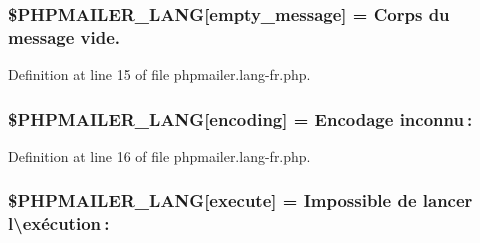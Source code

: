\subsubsection[{\texorpdfstring{\$\+P\+H\+P\+M\+A\+I\+L\+E\+R\+\_\+\+L\+A\+NG}{$PHPMAILER_LANG}}]{\setlength{\rightskip}{0pt plus 5cm}\$P\+H\+P\+M\+A\+I\+L\+E\+R\+\_\+\+L\+A\+NG\mbox{[}\textquotesingle{}empty\+\_\+message\textquotesingle{}\mbox{]} = \textquotesingle{}Corps du message vide.\textquotesingle{}}\hypertarget{phpmailer_8lang-fr_8php_a33772099f637c9d6c2cd7425e0e37fed}{}\label{phpmailer_8lang-fr_8php_a33772099f637c9d6c2cd7425e0e37fed}


Definition at line 15 of file phpmailer.\+lang-\/fr.\+php.

\subsubsection[{\texorpdfstring{\$\+P\+H\+P\+M\+A\+I\+L\+E\+R\+\_\+\+L\+A\+NG}{$PHPMAILER_LANG}}]{\setlength{\rightskip}{0pt plus 5cm}\$P\+H\+P\+M\+A\+I\+L\+E\+R\+\_\+\+L\+A\+NG\mbox{[}\textquotesingle{}encoding\textquotesingle{}\mbox{]} = \textquotesingle{}Encodage inconnu \+: \textquotesingle{}}\hypertarget{phpmailer_8lang-fr_8php_a817f7283f3d54c970a0c10305cc668cc}{}\label{phpmailer_8lang-fr_8php_a817f7283f3d54c970a0c10305cc668cc}


Definition at line 16 of file phpmailer.\+lang-\/fr.\+php.

\subsubsection[{\texorpdfstring{\$\+P\+H\+P\+M\+A\+I\+L\+E\+R\+\_\+\+L\+A\+NG}{$PHPMAILER_LANG}}]{\setlength{\rightskip}{0pt plus 5cm}\$P\+H\+P\+M\+A\+I\+L\+E\+R\+\_\+\+L\+A\+NG\mbox{[}\textquotesingle{}execute\textquotesingle{}\mbox{]} = \textquotesingle{}Impossible de lancer l\textbackslash{}\textquotesingle{}exécution \+: \textquotesingle{}}\hypertarget{phpmailer_8lang-fr_8php_a668217a9563a168f30f2a8548b6ed5a9}{}\label{phpmailer_8lang-fr_8php_a668217a9563a168f30f2a8548b6ed5a9}


